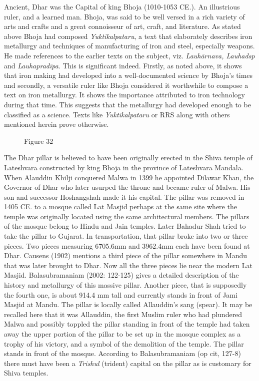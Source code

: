 Ancient, Dhar was the Capital of king Bhoja (1010-1053 CE.). An illustrious ruler, and a learned man. Bhoja, was said to be well versed in a rich variety of arts and crafts and a great connoisseur of art, craft, and literature. As stated above Bhoja had composed {\it Yuktikalpataru}, a text that elaborately describes iron metallurgy and techniques of manufacturing of iron and steel, especially weapons. He made references to the earlier texts on the subject, viz. {\it Lauhārnava, Lauhadsp} and {\it Lauhapradīpa}. This is significant indeed. Firstly, as noted above, it shows that iron making had developed into a well-documented science by Bhoja's times and secondly, a versatile ruler like Bhoja considered it worthwhile to compose a text on iron metallurgy. It shows the importance attributed to iron technology during that time. This suggests that the metallurgy had developed enough to be classified as a science. Texts like {\it Yuktikalpataru} or RRS along with others mentioned herein prove otherwise. 
\begin{figure}[H]
\centerline{Figure 32}
\end{figure}

The Dhar pillar is believed to have been originally erected in the Shiva temple of Lateshvara constructed by king Bhoja in the province of Lateshvara Mandala. When Alauddin Khilji conquered Malwa in 1399 he appointed Dilawar Khan, the Governor of Dhar who later usurped the throne and became ruler of Malwa. His son and successor Hoshangshah made it his capital. The pillar was removed in 1405 CE. to a mosque called Lat Masjid perhaps at the same site where the temple was originally located using the same architectural members. The pillars of the mosque belong to Hindu and Jain temples. Later Bahadur Shah tried to take the pillar to Gujarat. In transportation, that pillar broke into two or three pieces. Two pieces measuring 6705.6mm and 3962.4mm each have been found at Dhar. Causens (1902) mentions a third piece of the pillar somewhere in Mandu that was later brought to Dhar. Now all the three pieces lie near the modern Lat Masjid. Balasubramaniam (2002: 122-125) gives a detailed description of the history and metallurgy of this massive pillar. Another piece, that is supposedly the fourth one, is about 914.4 mm tall and currently stands in front of Jami Masjid at Mandu. The pillar is locally called Allauddin's sang (spear). It may be recalled here that it was Allauddin, the first Muslim ruler who had plundered Malwa and possibly toppled the pillar standing in front of the temple had taken away the upper portion of the pillar to be set up in the mosque complex as a trophy of his victory, and a symbol of the demolition of the temple. The pillar stands in front of the mosque. According to Balasubramaniam (op cit, 127-8) there must have been a {\it Trishul} (trident) capital on the pillar as is customary for Shiva temples. 

